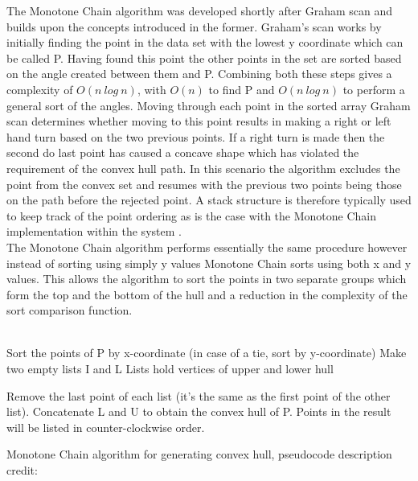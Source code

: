 \noindent
The Monotone Chain algorithm was developed shortly after Graham scan and builds upon the concepts introduced in the former. Graham's scan works by initially finding the point in the data set with the lowest y coordinate which can be called P. Having found this point the other points in the set are sorted based on the angle created between them and P. Combining both these steps gives a complexity of $O(n\ log\ n)$, with  $O(n)$ to find P and $O(n\ log\ n)$ to perform a general sort of the angles. Moving through each point in the sorted array Graham scan determines whether moving to this point results in making a right or left hand turn based on the two previous points. If a right turn is made then the second do last point has caused a concave shape which has violated the requirement of the convex hull path. In this scenario the algorithm excludes the point from the convex set and resumes with the previous two points being those on the path before the rejected point. A stack structure is therefore typically used to keep track of the point ordering as is the case with the Monotone Chain implementation within the system \cite{ChainHull}. \\ 

\noindent
The Monotone Chain algorithm performs essentially the same procedure however instead of sorting using simply y values Monotone Chain sorts using both x and y values. This allows the algorithm to sort the points in two separate groups which form the top and the bottom of the hull and a reduction in the complexity of the sort comparison function. \\ \\ 

\begin{algorithm}[H]
\footnotesize


	Sort the points of P by x-coordinate (in case of a tie, sort by y-coordinate)\;
	Make two empty lists I and L
	Lists hold vertices of upper and lower hull\;
	
	
	
Remove the last point of each list (it's the same as the first point of the other list).\;
Concatenate L and U to obtain the convex hull of P.\;
Points in the result will be listed in counter-clockwise order.\;

\caption{Monotone Chain algorithm for generating convex hull, pseudocode description credit: \cite{MonotoneChain}}\label{MonotoneChain}
\end{algorithm}

